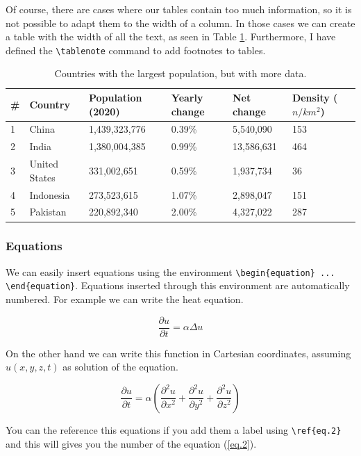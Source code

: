 Of course, there are cases where our tables contain too much information, so it is not possible to adapt them to the width of a column. In those cases we can create a table with the width of all the text, as seen in Table \ref{tab:extended_population}. Furthermore, I have defined the \verb+\tablenote+ command to add footnotes to tables.

\begin{table}[htb]
    \caption{Countries with the largest population, but with more data.}
    \label{tab:extended_population}
    \begin{tabular*}{\textwidth}{@{\extracolsep{\fill}} *{6}{l} @{}}
    \toprule
        \# & Country & Population (2020) & Yearly change & Net change & Density ($n/km^2$)\\
        \midrule
        1 & China & 1,439,323,776 & 0.39\% & 5,540,090 & 153 \\
        2 & India & 1,380,004,385 & 0.99\% & 13,586,631 & 464 \\
        3 & United States & 331,002,651 & 0.59\% & 1,937,734 & 36 \\
        4 & Indonesia & 273,523,615 & 1.07\% & 2,898,047 & 151 \\
        5 & Pakistan & 220,892,340 & 2.00\% & 4,327,022 & 287 \\
        \bottomrule
    \end{tabular*}
\end{table}

\subsubsection{Equations}

We can easily insert equations using the environment \verb+\begin{equation} ... \end{equation}+. Equations inserted through this environment are automatically numbered. For example we can write the heat equation.

\begin{equation}
    \frac{\partial u}{\partial t} = \alpha \Delta u
\end{equation}

On the other hand we can write this function in Cartesian coordinates, assuming $u(x,y,z,t)$ as solution of the equation.

\begin{equation}
    \frac{\partial u}{\partial t} = \alpha \left( \frac{\partial^2 u}{\partial x^2} + \frac{\partial^2 u}{\partial y^2} + \frac{\partial^2 u}{\partial z^2} \right)
    \label{eq.2}
\end{equation}

You can the reference this equations if you add them a label using \verb+\ref{eq.2}+ and this will gives you the number of the equation (\ref{eq.2}).